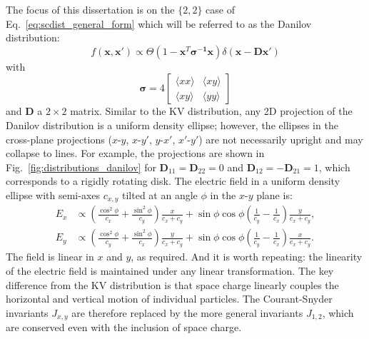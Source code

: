 The focus of this dissertation is on the $\{2, 2\}$ case of Eq.~\eqref{eq:scdist_general_form} which will be referred to as the Danilov distribution:
%
\begin{equation}
    f(\mathbf{x}, \mathbf{x}') \propto 
    \Theta\left({1 - \mathbf{x}^T\bm{\mathbf{\sigma}^{-1}}\mathbf{x}}\right)
    \delta\left({\mathbf{x} - \mathbf{D}\mathbf{x}'}\right)
\end{equation}
%
with 
%
\begin{equation}
    \bm{\sigma} = 
    4
    \begin{bmatrix}
        \langle{xx}\rangle & \langle{xy}\rangle \\
        \langle{xy}\rangle & \langle{yy}\rangle
    \end{bmatrix}
\end{equation}
%
and $\mathbf{D}$ a $2 \times 2$ matrix. Similar to the KV distribution, any 2D projection of the Danilov distribution is a uniform density ellipse; however, the ellipses in the cross-plane projections ($x$-$y$, $x$-$y'$, $y$-$x'$, $x'$-$y'$) are not necessarily upright and may collapse to lines. For example, the projections are shown in Fig.~\ref{fig:distributions_danilov} for $\mathbf{D}_{11}=\mathbf{D}_{22}=0$ and $\mathbf{D}_{12} = -\mathbf{D}_{21}=1$, which corresponds to a rigidly rotating disk. The electric field in a uniform density ellipse with semi-axes $c_{x,y}$ tilted at an angle $\phi$ in the $x$-$y$ plane is:
%
\begin{equation}
\begin{aligned}
    E_x &\propto 
    \left({\frac{\cos^2\phi}{c_x} + \frac{\sin^2\phi}{c_y}}\right) \frac{x}{c_x + c_y}
    +
    \sin\phi\cos\phi \left({\frac{1}{c_y} - \frac{1}{c_x}}\right) \frac{y}{c_x + c_y}, \\
    E_y &\propto 
    \left({\frac{\cos^2\phi}{c_y} + \frac{\sin^2\phi}{c_x}}\right) \frac{y}{c_x + c_y}
    +
    \sin\phi\cos\phi \left({\frac{1}{c_y} - \frac{1}{c_x} }\right) \frac{x}{c_x + c_y}.
\end{aligned}
\end{equation}
%
The field is linear in $x$ and $y$, as required. And it is worth repeating: the linearity of the electric field is maintained under any linear transformation. The key difference from the KV distribution is that space charge linearly couples the horizontal and vertical motion of individual particles. The Courant-Snyder invariants $J_{x,y}$ are therefore replaced by the more general invariants $J_{1, 2}$, which are conserved even with the inclusion of space charge. 

